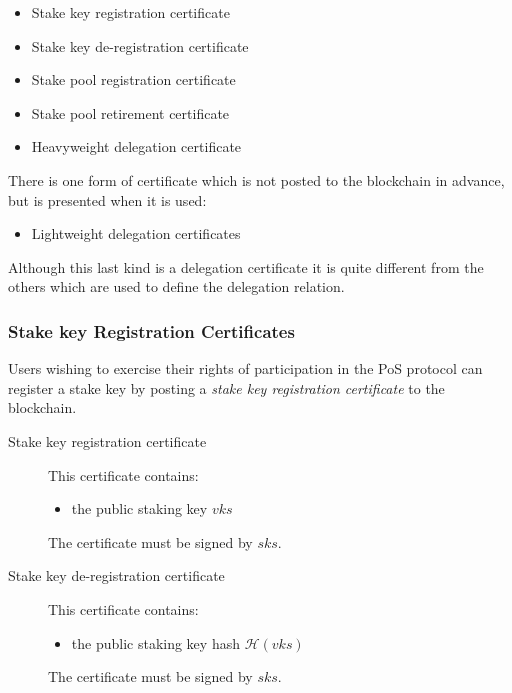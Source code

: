 \documentclass[11pt,a4paper]{article}
\begin{document}
\begin{itemize}
\item
  Stake key registration certificate
\item
  Stake key de-registration certificate
\item
  Stake pool registration certificate
\item
  Stake pool retirement certificate
\item
  Heavyweight delegation certificate
\end{itemize}

There is one form of certificate which is not posted to the blockchain
in advance, but is presented when it is used:

\begin{itemize}
\item
  Lightweight delegation certificates
\end{itemize}

Although this last kind is a delegation certificate it is quite
different from the others which are used to define the delegation
relation.

\subsubsection{Stake key Registration
Certificates}\label{stake-key-registration-certificates}

Users wishing to exercise their rights of participation in the PoS
protocol can register a stake key by posting a \emph{stake key
registration certificate} to the blockchain.

\begin{description}
\item[Stake key registration certificate]
This certificate contains:

\begin{itemize}
\item
  the public staking key \(vks\)
\end{itemize}

The certificate must be signed by \(sks\).
\item[Stake key de-registration certificate]
This certificate contains:

\begin{itemize}
\item
  the public staking key hash \(\mathcal{H}(vks)\)
\end{itemize}

The certificate must be signed by \(sks\).
\end{description}
\end{document}
